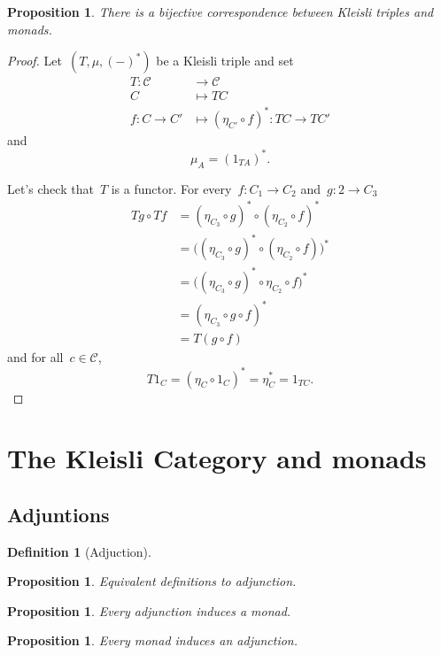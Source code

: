\documentclass[a4paper]{article}
\theoremstyle{plain}
\newtheorem{proposition}[theorem]{Proposition}
\theoremstyle{definition}
\newtheorem{definition}[theorem]{Definition}
\newcommand{\cat}[1]{\mathcal{#1}}
\begin{document}
\begin{proposition}
    There is a bijective correspondence between Kleisli triples and monads.
\end{proposition}
\begin{proof}
    Let~\((T, \mu, (-)^{\ast})\) be a Kleisli triple
    and set
    \begin{align*}
        T:\cat{C} & \longrightarrow\cat{C} \\
        C & \longmapsto TC \\
        f:C\rightarrow C' & \longmapsto
        (\eta_{C'}\circ f)^{\ast}:TC\longrightarrow TC'
    \end{align*}
    and
    \[
        \mu_{A} = (1_{TA})^{\ast}.
    \]

    Let's check that~\(T\) is a functor.
    For every~\(f:C_{1}\longrightarrow C_{2}\)
    and~\(g:{2}\longrightarrow C_{3}\)
    \begin{align*}
        Tg\circ Tf &= (\eta_{C_{3}}\circ g)^{\ast}\circ
                      (\eta_{C_{2}}\circ f)^{\ast} \\
                   &= \bigl((\eta_{C_{3}}\circ g)^{\ast}\circ
                      (\eta_{C_{2}}\circ f)\bigr)^{\ast} \\
                   &= \bigl((\eta_{C_{3}}\circ g)^{\ast}\circ
                      \eta_{C_{2}}\circ f\bigr)^{\ast} \\
                   &= (\eta_{C_{3}}\circ g\circ f)^{\ast} \\
                   &= T(g\circ f)
    \end{align*}
    and for all~\(c\in\cat{C}\),
    \[
        T1_{C} = (\eta_{C}\circ 1_{C})^{\ast} = \eta_{C}^{\ast} = 1_{TC}.
    \]
\end{proof}

\section{The Kleisli Category and monads}
\subsection{Adjuntions}
\begin{definition}[Adjuction]
\end{definition}
\begin{proposition}
    Equivalent definitions to adjunction.
\end{proposition}
\begin{proposition}
    Every adjunction induces a monad.
\end{proposition}
\begin{proposition}
    Every monad induces an adjunction.
\end{proposition}
\end{document}
